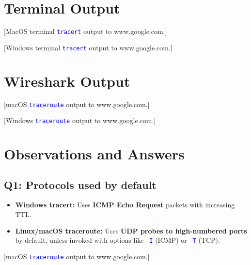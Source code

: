 \documentclass[10pt,a4paper]{report}
\newcommand{\command}[1]{\texttt{\textcolor{blue}{#1}}}
\begin{document}
\section{Terminal Output}

[MacOS terminal \command{tracert} output to www.google.com.]


[Windows terminal \command{tracert} output to www.google.com.]

\section{Wireshark Output}


[macOS \command{traceroute} output to www.google.com.]


[Windows \command{traceroute} output to www.google.com.]

\section{Observations and Answers}

\subsection*{Q1: Protocols used by default}
\begin{itemize}
    \item \textbf{Windows tracert:} Uses \textbf{ICMP Echo Request} packets with increasing TTL.  
    \item \textbf{Linux/macOS traceroute:} Uses \textbf{UDP probes to high-numbered ports} by default, unless invoked with options like \command{-I} (ICMP) or \command{-T} (TCP).  
\end{itemize}



[macOS \command{traceroute} output to www.google.com.]
\end{document}
